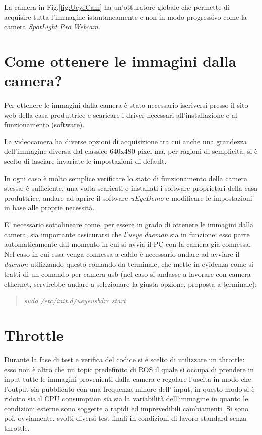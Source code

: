 La camera in Fig.\ref{fig:UeyeCam} ha un'otturatore globale che permette di acquisire tutta l'immagine istantaneamente e non in modo progressivo come la camera  \textit{SpotLight Pro Webcam}.

\section{Come ottenere le immagini dalla camera?}
Per ottenere le immagini dalla camera è stato necessario iscriversi presso il sito web della casa produttrice e scaricare i driver necessari all'installazione e al funzionamento (\href{https://en.ids-imaging.com/manuals-ueye-software.html}{software}).

La videocamera ha diverse opzioni di acquisizione tra cui anche una grandezza dell'immagine diversa dal classico 640x480 pixel ma, per ragioni di semplicità, si è scelto di lasciare invariate le impostazioni di default.

In ogni caso è molto semplice verificare lo stato di funzionamento della camera stessa: è sufficiente, una volta scaricati e installati i software proprietari della casa produttrice, andare ad aprire il software \textit{uEyeDemo} e modificare le impostazioni in base alle proprie necessità.

E' necessario sottolineare come, per essere in grado di ottenere le immagini dalla camera, sia importante assicurarsi che \textit{l'ueye daemon} sia in funzione: esso parte automaticamente dal momento in cui si avvia il PC con la camera già connessa. Nel caso in cui essa venga connessa a caldo è necessario andare ad avviare il \textit{daemon} utilizzando questo comando da terminale, che mette in evidenza come si tratti di un comando per camera usb (nel caso si andasse a lavorare con camera ethernet, servirebbe andare a selezionare la giusta opzione, proposta a terminale):

\begin{quotation}
	\textsl{sudo /etc/init.d/ueyeusbdrc start}
\end{quotation}
\section{Throttle}
Durante la fase di test e verifica del codice si è scelto di utilizzare un throttle:
esso non è altro che un topic predefinito di ROS il quale si occupa di prendere in input tutte le immagini provenienti dalla camera e regolare l'uscita in modo che l'output sia pubblicato con una frequenza minore dell' input; in questo modo si è ridotto sia il CPU consumption sia sia la variabilità dell'immagine in quanto le condizioni esterne sono soggette a rapidi ed imprevedibili cambiamenti.
Si sono poi, ovviamente, svolti diversi test finali in condizioni di lavoro standard senza throttle.
